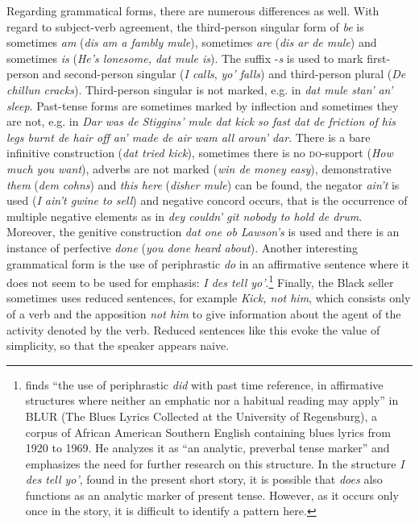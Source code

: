 Regarding grammatical forms, there are numerous differences as well. With regard to subject-verb agreement, the third-person singular form of \emph{be} is sometimes \emph{am} (\emph{dis am a fambly mule}), sometimes \emph{are} (\emph{dis ar de mule}) and sometimes \emph{is} (\emph{He’s lonesome, dat mule is}). The suffix -\emph{s} is used to mark first-person and second-person singular (\emph{I calls}, \emph{yo’ falls}) and third-person plural (\emph{De chillun cracks}). Third-person singular is not marked, e.g. in \emph{dat mule stan’ an’ sleep}. Past-tense forms are sometimes marked by inflection and sometimes they are not, e.g. in \emph{Dar was de Stiggins’ mule dat kick so fast dat de friction of his legs burnt de hair off an’ made de air wam all aroun’ dar}. There is a bare infinitive construction (\emph{dat tried kick}), sometimes there is no \textsc{do}{}-support (\emph{How much you want}), adverbs are not marked (\emph{win de money easy}), demonstrative \emph{them} (\emph{dem cohns}) and \emph{this here} (\emph{disher mule}) can be found, the negator \emph{ain’t} is used (\emph{I ain’t gwine to sell}) and negative concord occurs, that is the occurrence of multiple negative elements as in \emph{dey couldn’ git nobody to hold de drum}. Moreover, the genitive construction \emph{dat one ob Lawson’s} is used and there is an instance of perfective \emph{done} (\emph{you done heard about}). Another interesting grammatical form is the use of periphrastic \emph{do} in an affirmative sentence where it does not seem to be used for emphasis: \emph{I des tell yo’}.\footnote{\citet{Schneider2015} finds “the use of periphrastic \emph{did} with past time reference, in affirmative structures where neither an emphatic nor a habitual reading may apply” in BLUR (The Blues Lyrics Collected at the University of Regensburg), a corpus of African American Southern English containing blues lyrics from 1920 to 1969. He analyzes it as “an analytic, preverbal tense marker” and emphasizes the need for further research on this structure. In the structure \emph{I des tell yo’}, found in the present short story, it is possible that \emph{does} also functions as an analytic marker of present tense. However, as it occurs only once in the story, it is difficult to identify a pattern here.} Finally, the Black seller sometimes uses reduced sentences, for example \emph{Kick, not him}, which consists only of a verb and the apposition \emph{not him} to give information about the agent of the activity denoted by the verb. Reduced sentences like this evoke the value of simplicity, so that the speaker appears naive.

